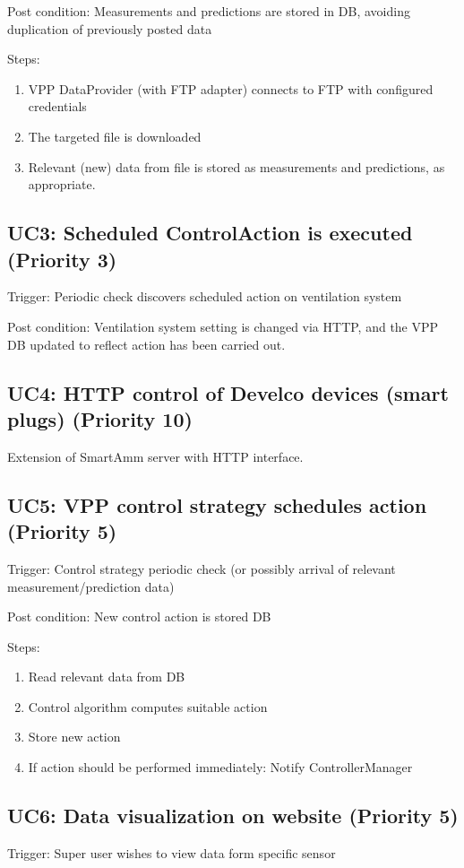 \noindent Post condition: Measurements and predictions are stored in DB, avoiding duplication of previously posted data

\noindent Steps: 
\begin{enumerate}
    \item VPP DataProvider (with FTP adapter) connects to FTP with configured credentials
    \item The targeted file is downloaded
    \item Relevant (new) data from file is stored as measurements and predictions, as appropriate.
\end{enumerate}

\subsection*{UC3: Scheduled ControlAction is executed (Priority 3)}
\noindent Trigger: Periodic check discovers scheduled action on ventilation system

\noindent Post condition: Ventilation system setting is changed via HTTP, and the VPP DB updated to reflect action has been carried out.

\subsection*{UC4: HTTP control of Develco devices (smart plugs) (Priority 10)}
Extension of SmartAmm server with HTTP interface.

\subsection*{UC5: VPP control strategy schedules action (Priority 5)}
\noindent Trigger: Control strategy periodic check (or possibly arrival of relevant measurement/prediction data)

\noindent Post condition: New control action is stored DB

\noindent Steps: 
\begin{enumerate}
    \item Read relevant data from DB
    \item Control algorithm computes suitable action
    \item Store new action
    \item If action should be performed immediately: Notify ControllerManager
\end{enumerate}

\subsection*{UC6: Data visualization on website (Priority 5)}
\noindent Trigger: Super user wishes to view data form specific sensor

